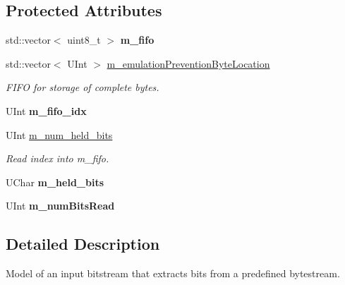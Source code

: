 \subsection*{Protected Attributes}
\begin{DoxyCompactItemize}
\item 
\mbox{\label{class_t_com_input_bitstream_ad0e90464155dcbcad429ea13df618a50}} 
std\+::vector$<$ uint8\+\_\+t $>$ {\bfseries m\+\_\+fifo}
\item 
\mbox{\label{class_t_com_input_bitstream_a4a239e03accf4a5c3ab84a514b3bc332}} 
std\+::vector$<$ U\+Int $>$ \hyperlink{class_t_com_input_bitstream_a4a239e03accf4a5c3ab84a514b3bc332}{m\+\_\+emulation\+Prevention\+Byte\+Location}
\begin{DoxyCompactList}\small\item\em F\+I\+FO for storage of complete bytes. \end{DoxyCompactList}\item 
\mbox{\label{class_t_com_input_bitstream_a9a8fb69a002ba6450d8a93dd3d6c9dcb}} 
U\+Int {\bfseries m\+\_\+fifo\+\_\+idx}
\item 
\mbox{\label{class_t_com_input_bitstream_ab05c271de7377407555843c280f5a0d4}} 
U\+Int \hyperlink{class_t_com_input_bitstream_ab05c271de7377407555843c280f5a0d4}{m\+\_\+num\+\_\+held\+\_\+bits}
\begin{DoxyCompactList}\small\item\em Read index into m\+\_\+fifo. \end{DoxyCompactList}\item 
\mbox{\label{class_t_com_input_bitstream_aff795915e44482761e3bfe6465d452b5}} 
U\+Char {\bfseries m\+\_\+held\+\_\+bits}
\item 
\mbox{\label{class_t_com_input_bitstream_a805bdaa3c62bb93bb028d9820c9c260f}} 
U\+Int {\bfseries m\+\_\+num\+Bits\+Read}
\end{DoxyCompactItemize}


\subsection{Detailed Description}
Model of an input bitstream that extracts bits from a predefined bytestream. 

